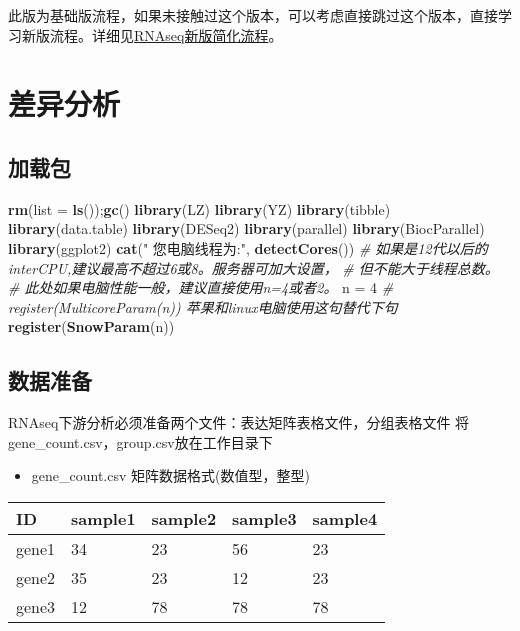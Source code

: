 \documentclass[
]{book}
\newenvironment{Shaded}{\begin{snugshade}}{\end{snugshade}}
\newcommand{\AttributeTok}[1]{\textcolor[rgb]{0.13,0.29,0.53}{#1}}
\newcommand{\CommentTok}[1]{\textcolor[rgb]{0.56,0.35,0.01}{\textit{#1}}}
\newcommand{\DecValTok}[1]{\textcolor[rgb]{0.00,0.00,0.81}{#1}}
\newcommand{\FunctionTok}[1]{\textcolor[rgb]{0.13,0.29,0.53}{\textbf{#1}}}
\newcommand{\NormalTok}[1]{#1}
\newcommand{\OtherTok}[1]{\textcolor[rgb]{0.56,0.35,0.01}{#1}}
\newcommand{\StringTok}[1]{\textcolor[rgb]{0.31,0.60,0.02}{#1}}
\providecommand{\tightlist}{%
  \setlength{\itemsep}{0pt}\setlength{\parskip}{0pt}}
\begin{document}
此版为基础版流程，如果未接触过这个版本，可以考虑直接跳过这个版本，直接学习新版流程。详细见\hyperref[rnaseq_new_pipeline]{RNAseq新版简化流程}。

\section{差异分析}\label{deg-mian}

\subsection{加载包}\label{ux52a0ux8f7dux5305}

\begin{Shaded}
\begin{Highlighting}[]
\FunctionTok{rm}\NormalTok{(}\AttributeTok{list =} \FunctionTok{ls}\NormalTok{());}\FunctionTok{gc}\NormalTok{()}
\FunctionTok{library}\NormalTok{(LZ)}
\FunctionTok{library}\NormalTok{(YZ)}
\FunctionTok{library}\NormalTok{(tibble)}
\FunctionTok{library}\NormalTok{(data.table)}
\FunctionTok{library}\NormalTok{(DESeq2)}
\FunctionTok{library}\NormalTok{(parallel)}
\FunctionTok{library}\NormalTok{(BiocParallel)}
\FunctionTok{library}\NormalTok{(ggplot2)}
\FunctionTok{cat}\NormalTok{(}\StringTok{" 您电脑线程为:"}\NormalTok{, }\FunctionTok{detectCores}\NormalTok{())}
\CommentTok{\# 如果是12代以后的interCPU,建议最高不超过6或8。服务器可加大设置，}
\CommentTok{\#  但不能大于线程总数。}
\CommentTok{\# 此处如果电脑性能一般，建议直接使用n=4或者2。}
\NormalTok{n }\OtherTok{=} \DecValTok{4}
\CommentTok{\# register(MulticoreParam(n)) 苹果和linux电脑使用这句替代下句}
\FunctionTok{register}\NormalTok{(}\FunctionTok{SnowParam}\NormalTok{(n))}
\end{Highlighting}
\end{Shaded}

\subsection{数据准备}\label{ux6570ux636eux51c6ux5907}

RNAseq下游分析必须准备两个文件：表达矩阵表格文件，分组表格文件
将gene\_count.csv，group.csv放在工作目录下

\begin{itemize}
\tightlist
\item
  gene\_count.csv 矩阵数据格式(数值型，整型)
\end{itemize}

\begin{longtable}[]{@{}lllll@{}}
\toprule\noalign{}
ID & sample1 & sample2 & sample3 & sample4 \\
\midrule\noalign{}
\endhead
\bottomrule\noalign{}
\endlastfoot
gene1 & 34 & 23 & 56 & 23 \\
gene2 & 35 & 23 & 12 & 23 \\
gene3 & 12 & 78 & 78 & 78 \\
\end{longtable}
\end{document}

